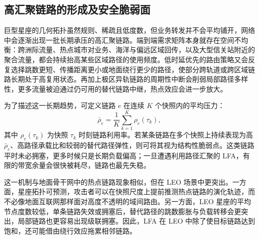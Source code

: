 \subsection{高汇聚链路的形成及安全脆弱面}

巨型星座的几何拓扑虽然规则、稀疏且低度数，但业务转发并不会平均铺开，网络中会逐渐出现一批长期承压的高汇聚链路。端到端需求矩阵本身就存在空间不均衡：跨洲际流量、热点城市对业务、海洋与偏远区域回传，以及大型信关站附近的聚合流量，都会持续抬高某些区域路径的使用频度。低时延优先的路由策略又会反复选择跳数更短、传播距离更小或地面绕行更少的路径，使部分跨轨道或跨区域链路长期处于高复用状态。再加上极区异轨链路的周期性中断会削弱局部路径多样性，更多流量被迫通过仍可用的替代链路中继，热点效应会进一步放大。

为了描述这一长期趋势，可定义链路 $e$ 在连续 $K$ 个快照内的平均压力：
\begin{equation}
    \bar{\rho}_e=\frac{1}{K}\sum_{k=1}^{K}\rho_e(\tau_k),
\end{equation}
其中 $\rho_e(\tau_k)$ 为快照 $\tau_k$ 时刻链路利用率。若某条链路在多个快照上持续表现为高 $\bar{\rho}_e$、高路径承载比和较弱的替代路径弹性，则可将其视为结构性脆弱点。这类链路平时未必拥塞，更多时候只是长期负载偏高；一旦遭遇利用路径汇聚的 LFA，有限的带宽余量会很快被耗尽，链路也最先失稳。

这一机制与地面骨干网中的热点链路现象相似，但在 LEO 场景中更突出。一方面，星座拓扑可预测，攻击者可以在快照尺度上提前推测热点链路的演化轨迹，而不必像地面互联网那样面对高度不透明的域间路由。另一方面，LEO 星座的平均节点度数较低，单条链路失效或拥塞后，替代路径的跳数膨胀与负载转移会更突出，局部链路也更容易出现级联拥塞。因此，LFA 在 LEO 中除了使目标链路达到饱和，还可能借由绕行效应拖累相邻链路。



